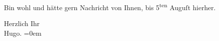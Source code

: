 \pstart
           Bin wohl und hätte gern Nachricht von Ihnen, bis 5\textsuperscript{ten} Auguſt hierher.\pend
           
\pstart
           Herzlich Ihr{\\[\baselineskip]}\spacefill\mbox{Hugo.}\pend
           \leftskip=0em{}\endnumbering{}  \newcommand{\dateiname}{L00711}\newcommand{\titel}{Hugo von Hofmannsthal an Arthur Schnitzler, 27. 7. 1897}\newcommand{\editorInnen}{Martin Anton Müller und Gerd-Hermann Susen}
